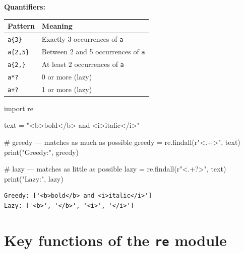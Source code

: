 \documentclass[
  english,
  letterpaper,
  DIV=11,
  numbers=noendperiod]{scrreprt}
\newenvironment{Shaded}{\begin{snugshade}}{\end{snugshade}}
\newcommand{\BuiltInTok}[1]{\textcolor[rgb]{0.00,0.23,0.31}{#1}}
\newcommand{\CommentTok}[1]{\textcolor[rgb]{0.37,0.37,0.37}{#1}}
\newcommand{\DecValTok}[1]{\textcolor[rgb]{0.68,0.00,0.00}{#1}}
\newcommand{\ImportTok}[1]{\textcolor[rgb]{0.00,0.46,0.62}{#1}}
\newcommand{\NormalTok}[1]{\textcolor[rgb]{0.00,0.23,0.31}{#1}}
\newcommand{\OperatorTok}[1]{\textcolor[rgb]{0.37,0.37,0.37}{#1}}
\newcommand{\StringTok}[1]{\textcolor[rgb]{0.13,0.47,0.30}{#1}}
\newcommand{\VerbatimStringTok}[1]{\textcolor[rgb]{0.13,0.47,0.30}{#1}}
\newcounter{none} %
\begin{document}
\textbf{Quantifiers:}

{\def\LTcaptype{none} %
\begin{longtable}[]{@{}ll@{}}
\toprule\noalign{}
Pattern & Meaning \\
\midrule\noalign{}
\endhead
\bottomrule\noalign{}
\endlastfoot
\texttt{a\{3\}} & Exactly 3 occurrences of \texttt{a} \\
\texttt{a\{2,5\}} & Between 2 and 5 occurrences of \texttt{a} \\
\texttt{a\{2,\}} & At least 2 occurrences of \texttt{a} \\
\texttt{a*?} & 0 or more (lazy) \\
\texttt{a+?} & 1 or more (lazy) \\
\end{longtable}
}

\begin{Shaded}
\begin{Highlighting}[]
\ImportTok{import}\NormalTok{ re}

\NormalTok{text }\OperatorTok{=} \StringTok{"\textless{}b\textgreater{}bold\textless{}/b\textgreater{} and \textless{}i\textgreater{}italic\textless{}/i\textgreater{}"}

\CommentTok{\# greedy — matches as much as possible}
\NormalTok{greedy }\OperatorTok{=}\NormalTok{ re.findall(}\VerbatimStringTok{r"\textless{}}\DecValTok{.}\OperatorTok{+}\VerbatimStringTok{\textgreater{}"}\NormalTok{, text)}
\BuiltInTok{print}\NormalTok{(}\StringTok{"Greedy:"}\NormalTok{, greedy)}

\CommentTok{\# lazy — matches as little as possible}
\NormalTok{lazy }\OperatorTok{=}\NormalTok{ re.findall(}\VerbatimStringTok{r"\textless{}}\DecValTok{.}\OperatorTok{+?}\VerbatimStringTok{\textgreater{}"}\NormalTok{, text)}
\BuiltInTok{print}\NormalTok{(}\StringTok{"Lazy:"}\NormalTok{, lazy)}
\end{Highlighting}
\end{Shaded}

\begin{verbatim}
Greedy: ['<b>bold</b> and <i>italic</i>']
Lazy: ['<b>', '</b>', '<i>', '</i>']
\end{verbatim}

\section{\texorpdfstring{Key functions of the \texttt{re}
module}{Key functions of the re module}}\label{key-functions-of-the-re-module}
\end{document}
